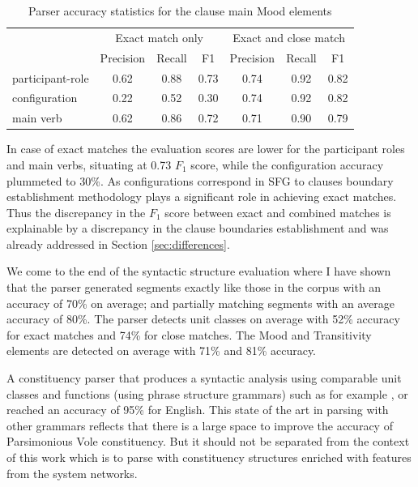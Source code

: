     \begin{table}[!ht]
    \centering
    \begin{tabular}{lcccccc}
    \toprule
     & \multicolumn{3}{c}{Exact match only} & \multicolumn{3}{c}{Exact and close match} \\ \cline{2-7} 
     & Precision & Recall & F1 & Precision & Recall & F1 \\ 
    \midrule
    participant-role &       0.62 &    0.88 & 0.73 &       0.74 &    0.92 & 0.82 \\
    configuration    &       0.22 &    0.52 & 0.30 &       0.74 &    0.92 & 0.82 \\
    main verb        &       0.62 &    0.86 & 0.72 &       0.71 &    0.90 & 0.79 \\ 
    \bottomrule
    \end{tabular}
    \caption{Parser accuracy statistics for the clause main Mood elements}
    \label{tab:unit-elements-transitivity-combined-F1}
    \end{table}
    
    In case of exact matches the evaluation scores are lower for the participant roles and main verbs, situating at 0.73 $F_1$ score, while the configuration accuracy plummeted to 30\%. As configurations correspond in SFG to clauses boundary establishment methodology plays a significant role in achieving exact matches. Thus the discrepancy in the $F_1$ score between exact and combined matches is explainable by a discrepancy in the clause boundaries establishment and was already addressed in Section \ref{sec:differences}. 
    
    We come to the end of the syntactic structure evaluation where I have shown that the parser generated segments exactly like those in the corpus with an accuracy of 70\% on average; and partially matching segments with an average accuracy of 80\%. The parser detects unit classes on average with 52\% accuracy for exact matches and 74\% for close matches. The Mood and Transitivity elements are detected on average with 71\% and 81\% accuracy. 
    
    A constituency parser that produces a syntactic analysis using comparable unit classes and functions (using phrase structure grammars) such as for example \citet{chen2014fast}, \citet{stern2017minimal} or \citet{kitaev2018multilingual} reached an accuracy of 95\% for English. This state of the art in parsing with other grammars reflects that there is a large space to improve the accuracy of Parsimonious Vole constituency. But it should not be separated from the context of this work which is to parse with constituency structures enriched with features from the system networks. %
    

